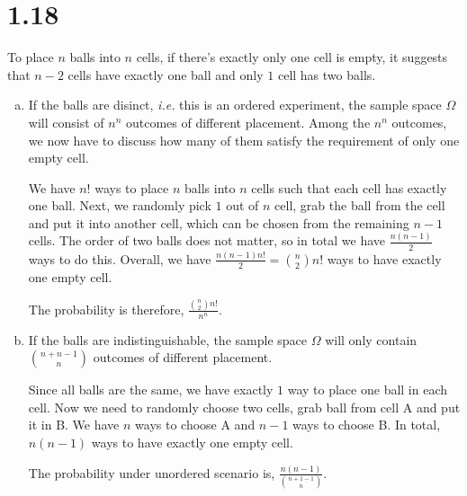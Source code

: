 \documentclass[letter]{article}
\begin{document}
    \section*{1.18}
    To place $n$ balls into $n$ cells, if there's exactly only one cell is empty, it suggests that $n-2$ cells have
    exactly one ball and only $1$ cell has two balls. 
    
    \begin{enumerate}[(a)]
    \item If the balls are disinct, \emph{i.e.} this is an ordered experiment, the sample space $\Omega$ 
    will consist of $n^n$ outcomes of different placement. Among the $n^n$ outcomes, we now have to 
    discuss how many of them satisfy the requirement of only one empty cell.

    We have $n!$ ways to place $n$ balls into $n$ cells such that each cell has exactly one ball.
    Next, we randomly pick $1$ out of $n$ cell, grab the ball from the cell and put it into another cell,
    which can be chosen from the remaining $n-1$ cells. The order of two balls does not matter, so 
    in total we have $\frac{n (n-1)}{2}$ ways to do this.
    Overall, we have $\frac{n(n-1) n!}{2} = \binom{n}{2} n!$ ways to have exactly one empty cell.

    The probability is therefore, $\frac{\binom{n}{2} n!}{n^n}$.

    \item If the balls are indistinguishable, the sample space $\Omega$ will only contain 
    $\binom{n+n-1}{n}$ outcomes of different placement. 
    
    Since all balls are the same, we have exactly $1$ way to place one ball in each cell. 
    Now we need to randomly choose two cells, grab ball from cell A and put it in B. We have $n$ ways
    to choose A and $n-1$ ways to choose B. In total, $n(n-1)$ ways to have exactly one empty cell.

    The probability under unordered scenario is, $\frac{n(n-1)}{\binom{n+1-1}{n}}$.

    \end{enumerate}
\end{document}
